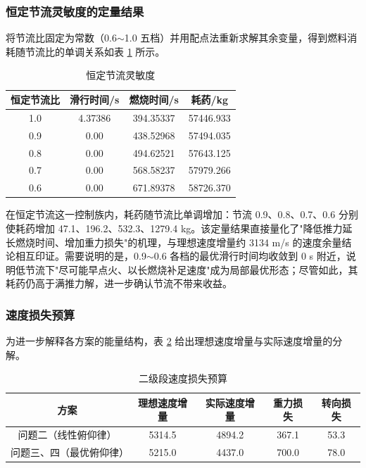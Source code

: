 \documentclass[withoutpreface,bwprint]{cumcmthesis}
\begin{document}
\subsubsection{恒定节流灵敏度的定量结果}
将节流比固定为常数（0.6$\sim$1.0 五档）并用配点法重新求解其余变量，得到燃料消耗随节流比的单调关系如表 \ref{tab:q4sens} 所示。

\begin{table}[!htbp]
\caption{恒定节流灵敏度}
\label{tab:q4sens}
\centering
\begin{tabular}{c|c|c|c}
\toprule[1.5pt]
恒定节流比 & 滑行时间/s & 燃烧时间/s & 耗药/kg \\
\midrule[1pt]
1.0 & 4.37386 & 394.35337 & 57446.933 \\
0.9 & 0.00 & 438.52968 & 57494.035 \\
0.8 & 0.00 & 494.62521 & 57643.125 \\
0.7 & 0.00 & 568.58237 & 57979.266 \\
0.6 & 0.00 & 671.89378 & 58726.370 \\
\bottomrule[1.5pt]
\end{tabular}
\end{table}

在恒定节流这一控制族内，耗药随节流比单调增加：节流 0.9、0.8、0.7、0.6 分别使耗药增加 47.1、196.2、532.3、1279.4 kg。该定量结果直接量化了"降低推力延长燃烧时间、增加重力损失"的机理，与理想速度增量约 3134 m/s 的速度余量结论相互印证。需要说明的是，0.9$\sim$0.6 各档的最优滑行时间均收敛到 0 s 附近，说明低节流下"尽可能早点火、以长燃烧补足速度"成为局部最优形态；尽管如此，其耗药仍高于满推力解，进一步确认节流不带来收益。

\subsubsection{速度损失预算}
为进一步解释各方案的能量结构，表 \ref{tab:loss} 给出理想速度增量与实际速度增量的分解。

\begin{table}[!htbp]
\caption{二级段速度损失预算}
\label{tab:loss}
\centering
\begin{tabular}{c|c|c|c|c}
\toprule[1.5pt]
方案 & 理想速度增量 & 实际速度增量 & 重力损失 & 转向损失 \\
\midrule[1pt]
问题二（线性俯仰律） & 5314.5 & 4894.2 & 367.1 & 53.3 \\
问题三、四（最优俯仰律） & 5215.0 & 4437.0 & 700.0 & 78.0 \\
\bottomrule[1.5pt]
\end{tabular}
\end{table}
\end{document}
